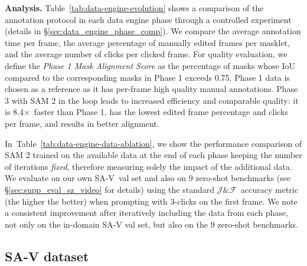 \documentclass[]{fairmeta}
\renewcommand{\paragraph}[1]{\vspace{1.25mm}\noindent\textbf{#1}}
\newcommand{\x}{{\times}}
\def\x{$\times$}
\newcommand{\secref}[1]{\S\ref{#1}}
\newcommand{\tabref}[1]{Table~\ref{#1}}
\newcommand{\jf}{$\mathcal{J}\&\mathcal{F}$\xspace}
\renewcommand{\paragraph}[1]{\vspace{1.25mm}\noindent\textbf{#1}}
\begin{document}
\paragraph{Analysis.} \tabref{tab:data-engine-evolution} shows a comparison of the annotation protocol in each data engine phase through a controlled experiment (details in \secref{sec:data_engine_phase_comp}). We compare the average annotation time per frame, the average percentage of manually edited frames per masklet, and the average number of clicks per clicked frame. For quality evaluation, we define the \emph{Phase 1 Mask Alignment Score} as the percentage of masks whose IoU compared to the corresponding masks in Phase 1 exceeds 0.75. Phase 1 data is chosen as a reference as it has per-frame high quality manual annotations. Phase 3 with SAM 2 in the loop leads to increased efficiency and comparable quality: it is 8.4\x~faster than Phase 1, has the lowest edited frame percentage and clicks per frame, and results in better alignment.






\setlength\intextsep{0.1pt}
\begin{table}


\vspace{-5pt}
\caption{Segmentation accuracy (\jf~metric) improvement from adding data from each data engine phase. ``VOS'' is a set of video object segmentation datasets.  Details are in~\S\ref{sec:supp_eval_sz}. %
}
\label{tab:data-engine-data-ablation}
\end{table}

In~\tabref{tab:data-engine-data-ablation}, we show the performance comparison of SAM 2 trained on the available data at the end of each phase keeping the number of iterations \textit{fixed}, therefore measuring solely the impact of the additional data. We evaluate on our own \mbox{SA-V val} set and also on 9 zero-shot benchmarks (see \secref{sec:supp_eval_sz_video} for details) using the standard \jf~accuracy metric (the higher the better) when prompting with 3-clicks on the first frame. We note a consistent improvement after iteratively including the data from each phase, not only on the in-domain SA-V val set, but also on the 9 zero-shot benchmarks.



\subsection{SA-V dataset}
\label{sec:dataset}
\end{document}
